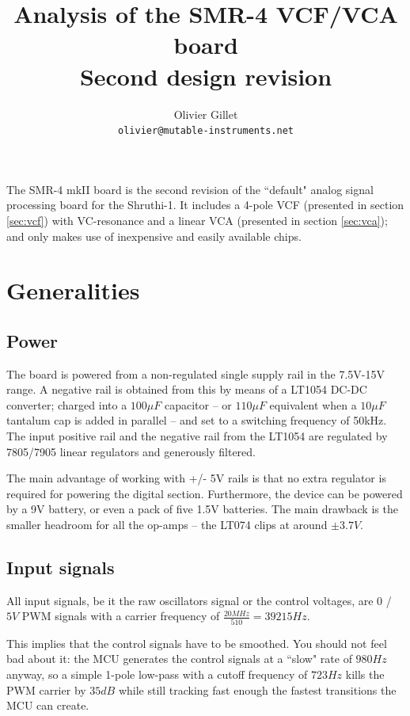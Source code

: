 \documentclass[a4paper,11pt]{article}
\title{Analysis of the SMR-4 VCF/VCA board\\Second design revision}
\author{Olivier Gillet \\ \tt olivier@mutable-instruments.net}
\date{}
\begin{document}
\maketitle

The SMR-4 mkII board is the second revision of the ``default" analog signal processing board for the  Shruthi-1. It includes a 4-pole VCF (presented in section \ref{sec:vcf}) with VC-resonance and a linear VCA (presented in section \ref{sec:vca}); and only makes use of inexpensive and easily available chips.

\section{Generalities}

\subsection{Power}

The board is powered from a non-regulated single supply rail in the 7.5V-15V range. A negative rail is obtained from this by means of a LT1054 DC-DC converter; charged into a $100\mu F$ capacitor -- or $110\mu F$ equivalent when a $10\mu F$ tantalum cap is added in parallel -- and set to a switching frequency of 50kHz. The input positive rail and the negative rail from the LT1054 are regulated by 7805/7905 linear regulators and generously filtered.

The main advantage of working with +/- 5V rails is that no extra regulator is required for powering the digital section. Furthermore, the device can be powered by a 9V battery, or even a pack of five 1.5V batteries. The main drawback is the smaller headroom for all the op-amps -- the LT074 clips at around $\pm 3.7V$.

\subsection{Input signals}

All input signals, be it the raw oscillators signal or the control voltages, are $0$ / $5V$ PWM signals with a carrier frequency of $\frac{20MHz}{510} = 39215 Hz$.

This implies that the control signals have to be smoothed. You should not feel bad about it: the MCU generates the control signals at a ``slow" rate of $980 Hz$ anyway, so a simple 1-pole low-pass with a cutoff frequency of $723 Hz$ kills the PWM carrier by $35dB$ while still tracking fast enough the fastest transitions the MCU can create.
\end{document}
